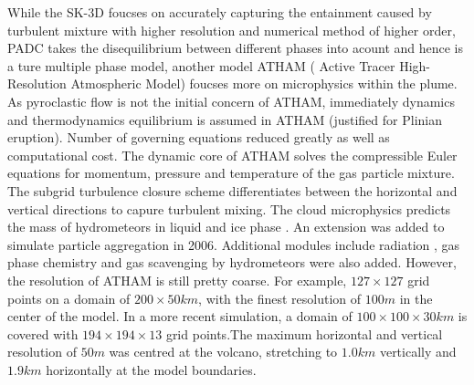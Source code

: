 \documentclass[10pt,a4paper]{article}
\begin{document}
While the SK-3D foucses on accurately capturing the entainment caused by turbulent mixture with higher resolution and numerical method of higher order, PADC takes the disequilibrium between different phases into acount and hence is a ture multiple phase model, another model ATHAM ( Active Tracer High-Resolution Atmospheric Model) \citep{oberhuber1998volcanic} foucses more on microphysics within the plume. As pyroclastic flow is not the initial concern of ATHAM, immediately dynamics and thermodynamics equilibrium is assumed in ATHAM (justified for Plinian eruption). Number of governing equations reduced greatly as well as computational cost. The dynamic core of ATHAM solves the compressible Euler equations for momentum, pressure and temperature of the gas particle mixture\citep{oberhuber1998volcanic}. The subgrid turbulence closure scheme differentiates between the horizontal and vertical directions \citep{herzog2003prognostic} to capure turbulent mixing. The cloud microphysics predicts the mass of hydrometeors in liquid and ice phase \citep{herzog1998effect}. An extension was added to simulate particle aggregation in 2006\citep{textor2006volcanic1, textor2006volcanic2}. Additional modules include radiation \citep{langmann1997radiative}, gas phase chemistry \citep{trentmann2002simulation} and gas scavenging by hydrometeors\citep{textor2003injection} were also added. However, the resolution of ATHAM is still pretty coarse. 
For example, $127 \times 127$ grid points on a domain of $200 \times 50km$, with the finest resolution of $100m$ in the center of the model\citep{herzog2003prognostic}. In a more recent simulation, a domain of $100 \times 100 \times 30km$ is covered with $194 \times 194 \times 13$ grid points.The maximum horizontal and vertical resolution of $50m$  was centred at the volcano, stretching to $1.0km$ vertically and $1.9km$ horizontally at the model boundaries\citep{van2015hail}.
\end{document}
